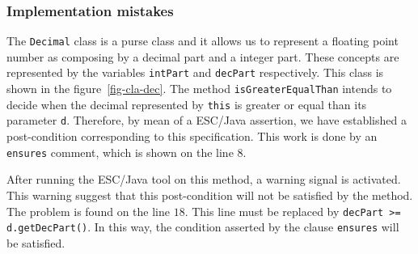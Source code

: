 \documentclass[a4paper]{llncs}
\begin{document}
\subsubsection{Implementation mistakes}
The \texttt{Decimal} class is a purse class and it allows us to
represent a floating point number as
composing by a decimal part and a integer part. These concepts are
represented by the variables \texttt{intPart} and \texttt{decPart}
respectively. This class is shown in the figure~\ref{fig-cla-dec}. The
method \texttt{isGreaterEqualThan} intends to decide when the decimal
represented by \texttt{this} is greater or equal than its parameter
\texttt{d}. Therefore, by mean of a ESC/Java assertion, we
have established a post-condition corresponding to this
specification. This work is done by an \texttt{ensures} comment, which
is shown on the line $8$. 

After running the ESC/Java tool on this method, a warning
signal is activated. This warning suggest that this post-condition
will not be satisfied by the method. The problem is found on the line
$18$. This line must be replaced by \texttt{decPart >=
d.getDecPart()}. In this way, the condition asserted by the clause
\texttt{ensures} will be satisfied.
\end{document}
